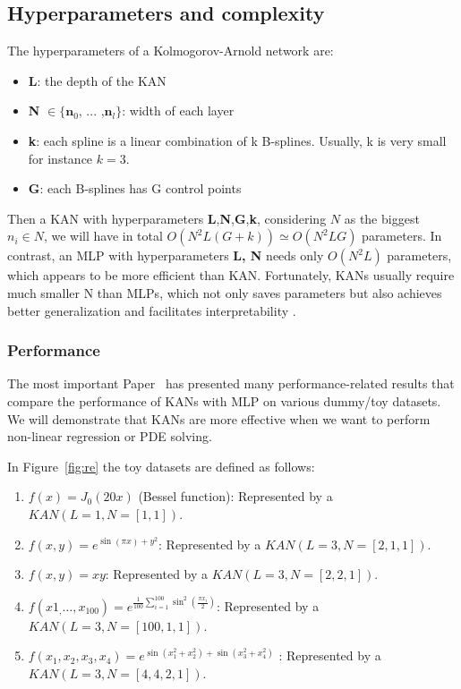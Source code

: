 \documentclass[12pt,a4paper]{article}
\begin{document}
\subsection{Hyperparameters and complexity}
The hyperparameters of a Kolmogorov-Arnold network are:
\begin{itemize}
    \item \textbf{L}: the depth of the KAN
    \item \textbf{N} $ \in \{\textbf{n}_0$, ... ,$\textbf{n}_l\}$: width of each layer
    \item \textbf{k}: each spline is a linear combination of k B-splines. Usually, k is very small for instance $k=3$.
    \item \textbf{G}: each B-splines has G control points
\end{itemize}

Then a KAN with hyperparameters \textbf{L},\textbf{N},\textbf{G},\textbf{k}, considering $N$ as the biggest $n_i \in N$, we will have in total $O(N^2L(G + k))  \simeq O(N^2LG)$ parameters. In contrast, an MLP with hyperparameters \textbf{L, N} needs only  $O(N^2L)$ parameters, which appears to be more efficient than KAN. Fortunately, KANs usually require much smaller N than MLPs, which not only saves parameters but also achieves better generalization and facilitates interpretability \cite{KAN}. 

\subsubsection{Performance}
The most important Paper~\cite{KAN} has presented many performance-related results that compare the performance of KANs with MLP on various dummy/toy datasets. We will demonstrate that KANs are more effective when we want to perform non-linear regression or PDE solving.

In Figure~\ref{fig:re} the toy datasets are defined as follows:
\begin{enumerate}
    \item $f(x) = J_0(20x)$ (Bessel function): Represented by a $KAN(L=1,N=[1,1])$.
    \item $f(x, y) = e^{\sin(\pi x)+y^2}$: Represented by a $KAN(L=3,N=[2, 1, 1])$.
    \item $f(x, y) = xy$: Represented by a $KAN(L=3,N=[2, 2, 1])$.
    \item $f(x1_,\dots , x_{100}) = e^{\frac{1}{100} 
    \sum_{i=1}^{100} \sin^2(\frac{\pi x_i}{2})}$: Represented by a $KAN(L=3,N=[100, 1, 1])$.

    \item $f(x_1, x_2, x_3, x_4) = e^ {\sin(x_1^2 + x_2^2)+ \sin(x_3^2 + x_4^2)}$ : Represented by a $KAN(L=3,N=[4,4, 2, 1])$.
\end{enumerate}
\end{document}
